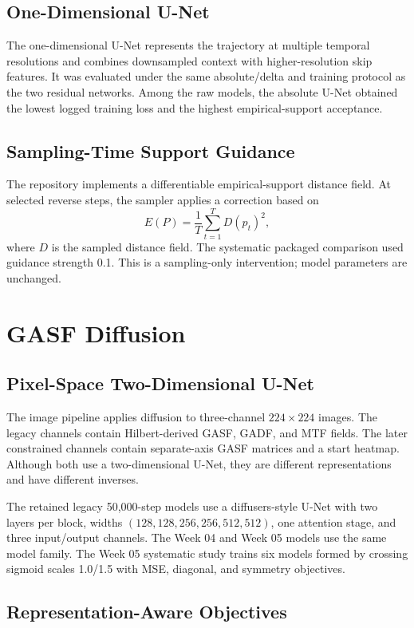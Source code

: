 \documentclass[12pt,a4paper,oneside]{report}
\begin{document}
\subsection{One-Dimensional U-Net}

The one-dimensional U-Net represents the trajectory at multiple temporal resolutions and combines downsampled context with higher-resolution skip features. It was evaluated under the same absolute/delta and training protocol as the two residual networks. Among the raw models, the absolute U-Net obtained the lowest logged training loss and the highest empirical-support acceptance.

\subsection{Sampling-Time Support Guidance}

The repository implements a differentiable empirical-support distance field. At selected reverse steps, the sampler applies a correction based on
\[
E(P)=\frac{1}{T}\sum_{t=1}^{T}D(p_t)^2,
\]
where $D$ is the sampled distance field. The systematic packaged comparison used guidance strength 0.1. This is a sampling-only intervention; model parameters are unchanged.

\section{GASF Diffusion}

\subsection{Pixel-Space Two-Dimensional U-Net}

The image pipeline applies diffusion to three-channel $224\times224$ images. The legacy channels contain Hilbert-derived GASF, GADF, and MTF fields. The later constrained channels contain separate-axis GASF matrices and a start heatmap. Although both use a two-dimensional U-Net, they are different representations and have different inverses.

The retained legacy 50,000-step models use a diffusers-style U-Net with two layers per block, widths $(128,128,256,256,512,512)$, one attention stage, and three input/output channels. The Week 04 and Week 05 models use the same model family. The Week 05 systematic study trains six models formed by crossing sigmoid scales 1.0/1.5 with MSE, diagonal, and symmetry objectives.

\subsection{Representation-Aware Objectives}
\end{document}
